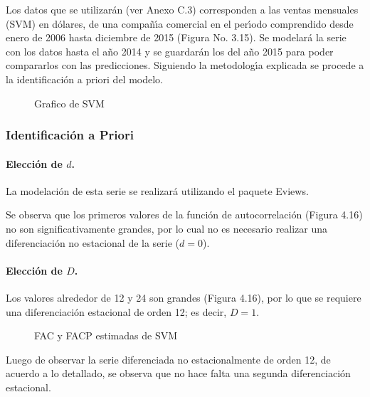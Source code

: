 \begin{ejemplo} Los datos que se 
utilizar\'{a}n (ver Anexo C.3) corresponden a las ventas mensuales (SVM) en 
d\'{o}lares, de una compa\~{n}\'{\i}a comercial en el per\'{\i}odo 
comprendido desde enero de 2006 hasta diciembre de 2015 (Figura No. 3.15). 
Se modelar\'{a} la serie con los datos hasta el a\~{n}o 2014 y se 
guardar\'{a}n los del a\~{n}o 2015 para poder compararlos con las 
predicciones. Siguiendo la metodolog\'{\i}a explicada se procede a la 
identificaci\'{o}n a priori del modelo.

\begin{figure}[H]
\centering
\caption{Grafico de SVM}
\end{figure}

\end{ejemplo}


\subsubsection*{Identificaci\'{o}n a Priori}

\paragraph{Elecci\'{o}n de $d$.} La modelaci\'{o}n de esta serie se realizar\'{a} utilizando el paquete Eviews.

Se observa que los primeros valores de la funci\'{o}n de autocorrelaci\'{o}n 
(Figura 4.16) no son significativamente grandes, por lo cual no es necesario 
realizar una diferenciaci\'{o}n no estacional de la serie ($d=0$).

\paragraph{Elecci\'{o}n de $D$.} Los valores alrededor de 12 y 24 son grandes (Figura 4.16), por lo que se requiere una diferenciaci\'{o}n estacional de orden 12; es decir, $D=1$.

\begin{figure}[H]
\centering
\caption{FAC y FACP estimadas de SVM}
\end{figure}

Luego de observar la serie diferenciada no estacionalmente de orden 12, de 
acuerdo a lo detallado, se observa que no hace falta una segunda 
diferenciaci\'{o}n estacional.


